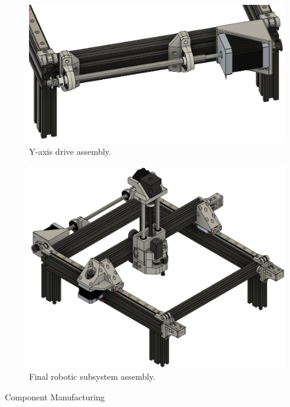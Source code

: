\begin{figure}[H]
	\centering
	\includegraphics[width=0.7\linewidth]{figures/y-axis-drive-assembly.png}
	\caption{Y-axis drive assembly.}
	\label{fig:y-axis-drive-assembly}
\end{figure}

\begin{figure}[H]
	\centering
	\includegraphics[width=0.9\linewidth]{figures/final-assembly.png}
	\caption{Final robotic subsystem assembly.}
	\label{fig:final-assembly}
\end{figure}

Component Manufacturing

